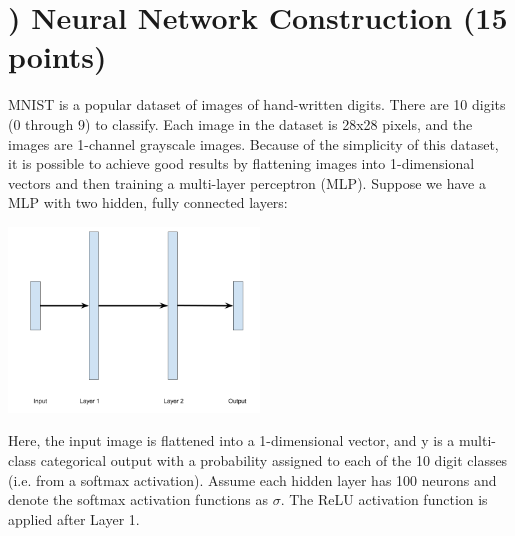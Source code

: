 \documentclass[11pt]{article}
\newcounter{QuestionCounter}
\begin{document}
\section*{) Neural Network Construction (15 points)}

MNIST is a popular dataset of images of hand-written digits. There are 10 digits (0 through 9) to classify. Each image in the dataset is 28x28 pixels, and the images are 1-channel grayscale images. Because of the simplicity of this dataset, it is possible to achieve good results by flattening images into 1-dimensional vectors and then training a multi-layer perceptron (MLP). Suppose we have a MLP with two hidden, fully connected layers:

\begin{center}
\includegraphics[width = 0.5\textwidth]{nn.png}
\end{center}

Here, the input image is flattened into a 1-dimensional vector, and y is a multi-class categorical output with a probability assigned to each of the 10 digit classes (i.e. from a softmax activation). Assume each hidden layer has 100 neurons and denote the softmax activation functions as $\sigma$. The ReLU activation function is applied after Layer 1.
\end{document}
